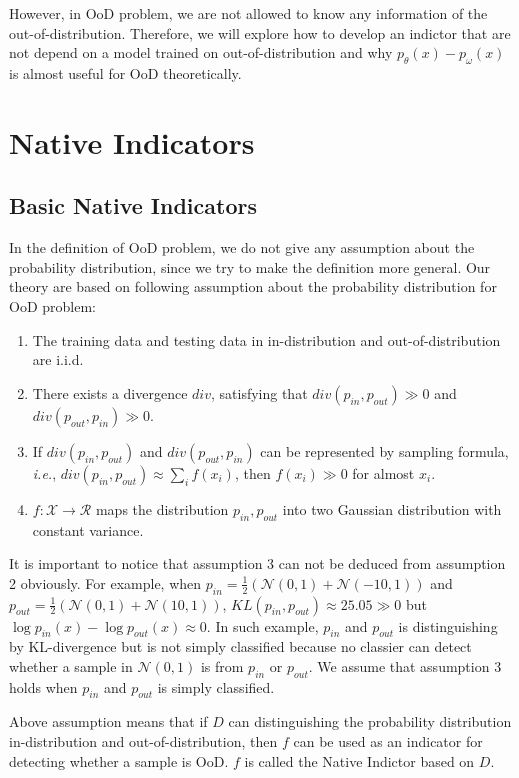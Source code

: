 \documentclass[letterpaper]{article} %
\newcommand{\IE}{\textit{i.e.}, }
\newcommand{\pin}{p_{in}}
\newcommand{\pout}{p_{out}}
\begin{document}
However, in OoD problem, we are not allowed to know any information of the out-of-distribution. 
Therefore, we will explore how to develop an indictor that are not depend on a model trained on out-of-distribution and why $p_\theta(x) - p_\omega(x)$ is almost useful for OoD theoretically. 

\section{Native Indicators}
\subsection{Basic Native Indicators}
In the definition of OoD problem, we do not give any assumption about the probability distribution, since we try to make the definition more general. Our theory are based on following assumption about the probability distribution for OoD problem:
\begin{enumerate}
	\item The training data and testing data in in-distribution and out-of-distribution are i.i.d. 
	\item There exists a divergence $div$, satisfying that $div(\pin, \pout) \gg 0$ and $div(\pout, \pin) \gg 0$. 
	\item If $div(\pin, \pout)$ and $div(\pout, \pin)$ can be represented by sampling formula, \IE $div(\pin, \pout) \approx \sum_{i} f(x_i)$, then $f(x_i) \gg 0$ for almost  $x_i$. 
	\item $f: \mathcal{X} \rightarrow \mathcal{R}$ maps the distribution $\pin, \pout$ into two Gaussian distribution with constant variance. 
\end{enumerate} 

It is important to notice that assumption 3 can not be deduced from assumption 2 obviously. For example, when $\pin = \frac{1}{2}(\mathcal{N}(0, 1) + \mathcal{N}(-10, 1))$ and $\pout = \frac{1}{2}(\mathcal{N}(0, 1) + \mathcal{N}(10, 1))$, $KL(\pin, \pout) \approx 25.05 \gg 0$ but $\log \pin(x) - \log \pout(x) \approx 0$.  In such example, $\pin$ and $\pout$ is distinguishing by KL-divergence but is not simply classified because no classier can detect whether a sample in $\mathcal{N}(0, 1)$ is from $\pin$ or $\pout$. We assume that assumption 3 holds when $\pin$ and $\pout$ is simply classified. 

Above assumption means that if $D$ can distinguishing the probability distribution in-distribution and out-of-distribution, then $f$ can be used as an indicator for detecting whether a sample is OoD. $f$ is called the Native Indictor based on $D$. 
\end{document}
